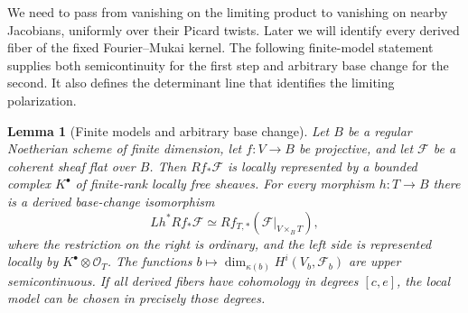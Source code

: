 \documentclass[11pt]{article}
\newtheorem{lemma}[theorem]{Lemma}
\numberwithin{equation}{section}
\begin{document}
We need to pass from vanishing on the limiting product to vanishing on
nearby Jacobians, uniformly over their Picard twists.  Later we will
identify every derived fiber of the fixed Fourier--Mukai kernel.
The following finite-model statement supplies both semicontinuity for
the first step and arbitrary base change for the second.  It also
defines the determinant line that identifies the limiting polarization.

\begin{lemma}[Finite models and arbitrary base change]
\label{p3sw:support-finite-model}
Let \(B\) be a regular Noetherian scheme of finite dimension, let
\(f:V\to B\) be projective, and let \(\mathcal F\) be a coherent sheaf
flat over \(B\).  Then \(Rf_*\mathcal F\) is locally represented by a
bounded complex \(K^\bullet\) of finite-rank locally free sheaves.
For every morphism \(h:T\to B\) there is a derived base-change
isomorphism
\begin{equation}
 Lh^*Rf_*\mathcal F
 \simeq Rf_{T,*}(\mathcal F|_{V\times_B T}),
 \label{p3sw:support-derived-base-change}
\end{equation}
where the restriction on the right is ordinary, and the left side is
represented locally by \(K^\bullet\otimes\mathcal O_T\).
The functions
\(b\mapsto\dim_{\kappa(b)}H^i(V_b,\mathcal F_b)\) are upper
semicontinuous.  If all derived fibers have cohomology in degrees
\([c,e]\), the local model can be chosen in precisely those degrees.
\end{lemma}
\end{document}
